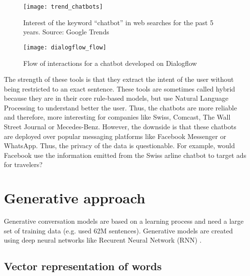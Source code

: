 \begin{figure}
    \centering
    \texttt{[image: trend\_chatbots]}
    \caption[Web search interest for ``chatbot'']{Interest of the keyword ``chatbot'' in web searches for the past 5 years. Source: Google Trends}
    \label{fig:trend_chatbot}
\end{figure}

\begin{figure}
    \centering
    \texttt{[image: dialogflow\_flow]}
    \caption[Dialogflow based chatbot]{Flow of interactions for a chatbot developed on Dialogflow}
    \label{fig:dialogflow}
\end{figure}

The strength of these tools is that they extract the intent of the user without being restricted to an exact sentence. These tools are sometimes called hybrid because they are in their core rule-based models, but use Natural Language Processing to understand better the user. Thus, the chatbots are more reliable and therefore, more interesting for companies like Swiss, Comcast, The Wall Street Journal or Mecedes-Benz. However, the downside is that these chatbots are deployed over popular messaging platforms like Facebook Messenger or WhatsApp. Thus, the privacy of the data is questionable. For example, would Facebook use the information emitted from the Swiss arline chatbot to target ads for travelers?

\section{Generative approach}
Generative conversation models are based on a learning process and need a large set of training data (e.g. \citet{1506.05869} used 62M sentences). Generative models are created using deep neural networks like Recurent Neural Network (RNN) \citep{1503.02364,1506.05869}.

\subsection{Vector representation of words}

